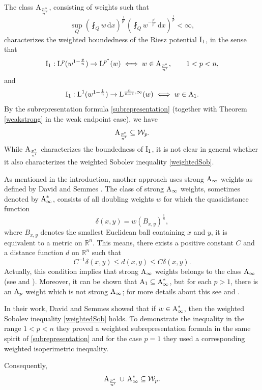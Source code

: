 \documentclass[11pt, a4paper, reqno]{amsart}
\newcommand{\R}{\mathbb R}
\newcommand{\A}{\textup A}
\newcommand{\dx}{\,{\mathrm dx}}
\newcommand{\Lup}{\textup{L}}
\theoremstyle{definition}
\theoremstyle{remark}
\begin{document}
The class $\A_{\frac{p^*}{n'}}$, consisting of weights such that
\[
\sup_Q\left(\fint_Q w\dx\right)^{\frac{1}{p^*}}
\left(\fint_Qw^{-\frac{p'}{p^*}}\dx\right)^{\frac1p}<\infty,
\]
characterizes the weighted boundedness of the Riesz potential $\textup{I}_1$, in the sense that
\[
\textup I_1:\Lup^p(w^{1-\frac{p}{n}})\rightarrow \Lup^{p^*}(w)
\iff  w \in \A_{\frac{p^*}{n'}}, \qquad 1<p<n,
\]
and
\[
\textup I_1:\Lup^1(w^{1-\frac{1}{n}})\rightarrow \Lup^{\frac{n}{n-1},\infty}(w)
\iff  w \in \A_1.
\]
By the subrepresentation formula \eqref{subrepresentation} (together with Theorem \ref{weakstrong} in the weak endpoint case), we have
\[
\A_{\frac{p^*}{n'}}\subseteq \mathcal W_p.
\]
While $\A_{\frac{p^*}{n'}}$ characterizes the boundedness of $\textup I_1$, it is not clear in general whether it also characterizes the weighted Sobolev inequality \eqref{weightedSob}.

As mentioned in the introduction, another approach uses strong $\A_\infty$ weights as defined by David and Semmes \cite{DS}. The class of strong $\A_\infty$ weights, sometimes denoted by $\A_\infty^*$, consists of all {doubling weights $w$ for which the quasidistance function
\[
\delta(x,y)=w(B_{x,y})^{\frac1n},
\]
where $B_{x,y}$ denotes the smallest Euclidean ball containing $x$ and $y$, it is equivalent to a metric on $\R^n$.} {This means, there exists a positive constant $C$ and a distance function $d$ on $\mathbb{R}^n$ such that 
\[
C^{-1}\delta(x,y) \leq d(x,y) \leq C \delta(x,y).
\]
Actually, this condition implies that strong $\A_\infty$ weights belongs to the class $\A_\infty$ (see \cite[Proposition 3.4]{Sem} and \cite{Ge}). Moreover, it can be shown that $\A_1 \subseteq \A^*_\infty$, but for each $p>1$, there is an $\A_p$ weight which is not strong $\A_\infty$; for more details about this see \cite{Sem} and \cite{DS}.}

In their work, David and Semmes showed that if $w\in \A_\infty^*$, then the weighted Sobolev inequality \eqref{weightedSob} holds. To demonstrate the inequality in the range $1<p<n$ they proved a weighted subrepresentation formula in the same spirit of  \eqref{subrepresentation} and for the case $p=1$ they used a corresponding weighted isoperimetric inequality.

Consequently,
\[
\A_{\frac{p^*}{n'}} \,\cup\, \A_\infty^* \subseteq \mathcal W_p.
\]
\end{document}

